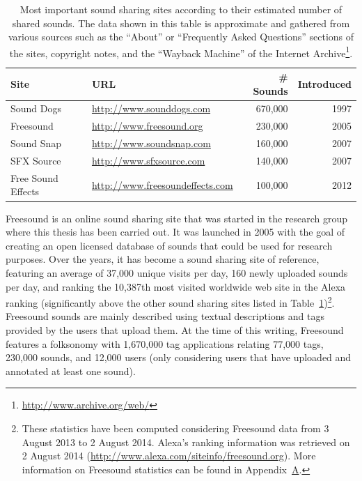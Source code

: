 \begin{table}
\begin{center}
\footnotesize
\begin{tabular}{@{}llr@{\hskip 0.5cm}r@{}}%
\toprule
\textbf{Site} & \textbf{URL} & \textbf{\# Sounds} & \textbf{Introduced} \\ 
\midrule %
Sound Dogs & \url{http://www.sounddogs.com} & 670,000 & 1997\\
Freesound & \url{http://www.freesound.org} & 230,000 & 2005\\
Sound Snap & \url{http://www.soundsnap.com} & 160,000 & 2007\\
SFX Source & \url{http://www.sfxsource.com} & 140,000 & 2007\\
Free Sound Effects & \url{http://www.freesoundeffects.com} & 100,000 & 2012\\ 
\bottomrule
\end{tabular}
\caption[Most important sound sharing sites according to their estimated number of shared sounds]{Most important sound sharing sites according to their estimated number of shared sounds.
The data shown in this table is approximate and gathered from various sources such as the ``About'' or ``Frequently Asked Questions'' sections of the sites, copyright notes, and the ``Wayback Machine'' of the Internet Archive\footnote{\url{http://www.archive.org/web/}}.}
\label{tab:audio_clip_sharing_sites}
\end{center}
\end{table}

Freesound is an online sound sharing site that was started in the research group where this thesis has been carried out. It was launched in 2005 with the goal of creating an open licensed database of sounds that could be used for research purposes. Over the years, it has become a sound sharing site of reference, featuring an average of 37,000 unique visits per day, 160 newly uploaded sounds per day, and ranking the 10,387th most visited worldwide web site in the Alexa ranking (significantly above the other sound sharing sites listed in Table~\ref{tab:audio_clip_sharing_sites})\footnote{These statistics have been computed considering Freesound data from 3 August 2013 to 2 August 2014. Alexa's ranking information was retrieved on 2 August 2014 (\url{http://www.alexa.com/siteinfo/freesound.org}). More information on Freesound statistics can be found in Appendix~\hyperref[appendix:Freesound]{A}.}. 
Freesound sounds are mainly described using textual descriptions and tags provided by the users that upload them. At the time of this writing, Freesound features a folksonomy with 1,670,000 tag applications relating 77,000 tags, 230,000 sounds, and 12,000 users (only considering users that have uploaded and annotated at least one sound).

